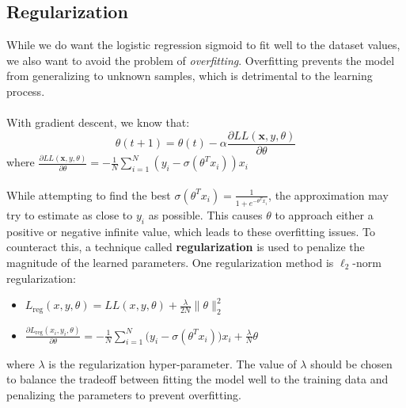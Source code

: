 \documentclass{article}
\begin{document}
\subsection{Regularization}
While we do want the logistic regression sigmoid to fit well to the dataset values, we also want to avoid the problem of \textit{overfitting}. Overfitting prevents the model from generalizing to unknown samples, which is detrimental to the learning process. 
\\\\
With gradient descent, we know that: 
\[
\theta(t+1)=\theta(t)-\alpha\frac{\partial LL(\textbf{x},y,\theta)}{\partial\theta}
\]
where $\frac{\partial LL(\textbf{x},y,\theta)}{\partial\theta} = -\frac{1}{N}\sum_{i=1}^{N}(y_i-\sigma(\theta^{T}x_i))x_i$
\\\\
While attempting to find the best $\sigma(\theta^{T}x_i)=\frac{1}{1+e^{-\theta^{T}x_i}}$, the approximation may try to estimate as close to $y_i$ as possible. This causes $\theta$ to approach either a positive or negative infinite value, which leads to these overfitting issues. To counteract this, a technique called \textbf{regularization} is used to penalize the magnitude of the learned parameters. One regularization method is $\ell_2$-norm regularization:
\begin{itemize}
    \item $L_{\text{reg}}(x,y,\theta)=LL(x,y,\theta)+\frac{\lambda}{2N}\|\theta\|_2^2$
    \item $\frac{\partial L_{\text{reg}}(x_i,y_i,\theta)}{\partial \theta}
    = -\frac{1}{N}\sum_{i=1}^{N}\big(y_i-\sigma(\theta^T x_i)\big)x_i+\frac{\lambda}{N}\theta$
\end{itemize}
where \textbf{$\lambda$} is the regularization hyper-parameter. The value of $\lambda$ should be chosen to balance the tradeoff between fitting the model well to the training data and penalizing the parameters to prevent overfitting.
\end{document}
